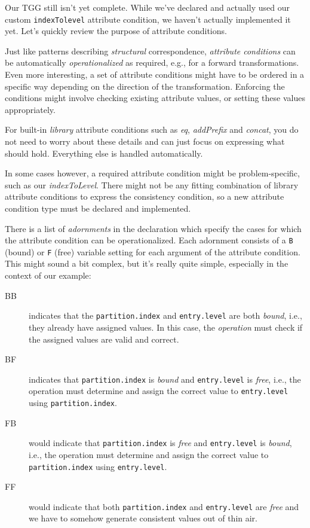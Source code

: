 Our TGG still isn't yet complete. 
While we've declared and actually used our custom \texttt{indexTolevel} attribute condition, we haven't actually implemented it yet. 
Let's quickly review the purpose of attribute conditions.

Just like patterns describing \emph{structural} correspondence, \emph{attribute conditions} can be automatically \emph{operationalized} as required, e.g., for a forward transformations. 
Even more interesting, a set of attribute conditions might have to be ordered in a specific way depending on the direction of the transformation.
Enforcing the conditions might involve checking existing attribute values, or setting these values appropriately.

For built-in \emph{library} attribute conditions such as \emph{eq}, \emph{addPrefix} and \emph{concat}, you do not need to worry about these details and can just focus
on expressing what should hold. 
Everything else is handled automatically.

In some cases however, a required attribute condition might be problem-specific, such as our \emph{indexToLevel}. 
There might not be any fitting combination of library attribute conditions to express the consistency condition, so a new attribute condition type must be declared and implemented.

There is a list of \emph{adornments} in the declaration which specify the cases for which the attribute condition can be operationalized. 
Each adornment consists of a \texttt{B} (bound) or \texttt{F} (free) variable setting for each argument of the attribute condition. 
This might sound a bit complex, but it's really quite simple, especially in the context of our example:

\begin{description}

\item[BB] indicates that the \texttt{partition.index} and \texttt{entry.level} are both \emph{bound}, i.e., they already have assigned values.
In this case, the \emph{operation} must check if the assigned values are valid and correct.

\item[BF] indicates that \texttt{partition.index} is \emph{bound} and \texttt{entry.level} is \emph{free}, i.e., the operation must determine and assign the correct value to \texttt{entry.level} using \texttt{partition.index}.

\item[FB] would indicate that \texttt{partition.index} is \emph{free} and \texttt{entry.level} is \emph{bound}, i.e., the operation must determine and assign the correct value to \texttt{parti\-tion.in\-dex} using \texttt{entry.level}.

\item[FF] would indicate that both \texttt{partition.index} and \texttt{entry.level} are \emph{free} and we have to somehow generate consistent values out of thin air.

\end{description}

